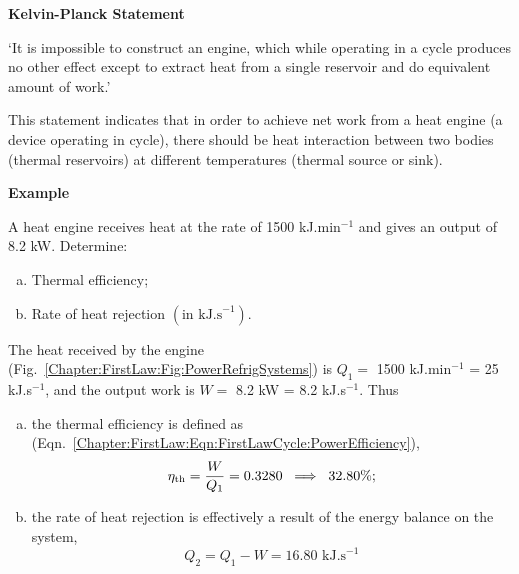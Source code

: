 \begin{shaded}
  \begin{center}
    {\bf Kelvin-Planck Statement}
  \end{center}
  `It is impossible to construct an engine, which while operating in a cycle produces no other effect except to extract heat from a single reservoir and do equivalent amount of work.'
\end{shaded}
This statement indicates that in order to achieve net work from a heat engine (\ie a device operating in cycle), there should be heat interaction between two bodies (\ie thermal reservoirs) at different temperatures (\ie thermal source or sink). 

   
   \begin{MyExample}{\begin{center}{\bf Example}\end{center}}
     \begin{example}\label{Chapter:SecondLaw:Example1}\citep{Rajput_Book}
        A heat engine receives heat at the rate of 1500 kJ.min$^{-1}$ and gives an output of 8.2 kW. Determine:
        \begin{enumerate}[a)]
          \item Thermal efficiency;
          \item Rate of heat rejection $\left(\text{in kJ.s}^{-1}\right)$.
        \end{enumerate}
     \end{example}

       The heat received by the engine (Fig.~\ref{Chapter:FirstLaw:Fig:PowerRefrigSystems}) is $Q_{1}=$ 1500 kJ.min$^{-1}$ = 25 kJ.s$^{-1}$, and the output work is $W=$ 8.2 kW = 8.2 kJ.s$^{-1}$. Thus
       \begin{enumerate}[a)]
         \item the thermal efficiency is defined as (Eqn.~\ref{Chapter:FirstLaw:Eqn:FirstLawCycle:PowerEfficiency}),
           \begin{displaymath}
             \eta_{\text{th}} = \displaystyle\frac{W}{Q_{1}} = 0.3280 \;\;\Longrightarrow\;\; 32.80\%;
           \end{displaymath}
         \item the rate of heat rejection is effectively a result of the energy balance on the system,
           \begin{displaymath}
             Q_{2}=Q_{1}-W = 16.80 \text{ kJ.s}^{-1}
           \end{displaymath}
           
       \end{enumerate}
   \end{MyExample}
   
